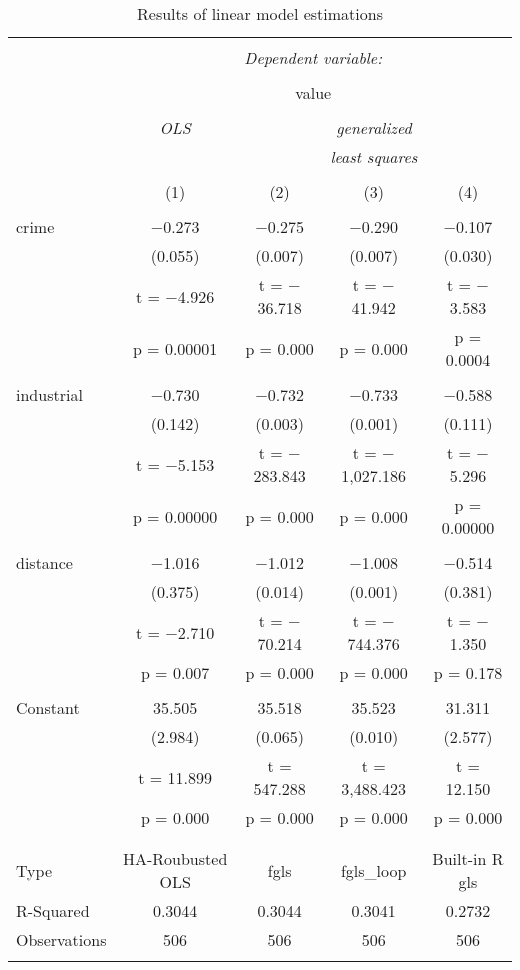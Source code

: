 \documentclass{article}
\theoremstyle{definition}
\begin{document}
\newpage
\begin{table}[htb] \centering 
	\caption{Results of linear model estimations} 
	\label{LS} 
	\small 
	\begin{tabular}{@{\extracolsep{5pt}}lcccc} 
		\\[-1.8ex]\hline 
		\hline \\[-1.8ex] 
		& \multicolumn{4}{c}{\textit{Dependent variable:}} \\ 
		\cline{2-5} 
		\\[-1.8ex] & \multicolumn{4}{c}{value} \\ 
		\\[-1.8ex] & \textit{OLS} & \multicolumn{3}{c}{\textit{generalized}} \\ 
		& \textit{} & \multicolumn{3}{c}{\textit{least squares}} \\ 
		\\[-1.8ex] & (1) & (2) & (3) & (4)\\ 
		\hline \\[-1.8ex] 
		crime & $-$0.273 & $-$0.275 & $-$0.290 & $-$0.107 \\ 
		& (0.055) & (0.007) & (0.007) & (0.030) \\ 
		& t = $-$4.926 & t = $-$36.718 & t = $-$41.942 & t = $-$3.583 \\ 
		& p = 0.00001 & p = 0.000 & p = 0.000 & p = 0.0004 \\ 
		& & & & \\ 
		industrial & $-$0.730 & $-$0.732 & $-$0.733 & $-$0.588 \\ 
		& (0.142) & (0.003) & (0.001) & (0.111) \\ 
		& t = $-$5.153 & t = $-$283.843 & t = $-$1,027.186 & t = $-$5.296 \\ 
		& p = 0.00000 & p = 0.000 & p = 0.000 & p = 0.00000 \\ 
		& & & & \\ 
		distance & $-$1.016 & $-$1.012 & $-$1.008 & $-$0.514 \\ 
		& (0.375) & (0.014) & (0.001) & (0.381) \\ 
		& t = $-$2.710 & t = $-$70.214 & t = $-$744.376 & t = $-$1.350 \\ 
		& p = 0.007 & p = 0.000 & p = 0.000 & p = 0.178 \\ 
		& & & & \\ 
		Constant & 35.505 & 35.518 & 35.523 & 31.311 \\ 
		& (2.984) & (0.065) & (0.010) & (2.577) \\ 
		& t = 11.899 & t = 547.288 & t = 3,488.423 & t = 12.150 \\ 
		& p = 0.000 & p = 0.000 & p = 0.000 & p = 0.000 \\ 
		& & & & \\ 
		\hline \\[-1.8ex] 
		Type & HA-Roubusted OLS & fgls & fgls\_loop & Built-in R gls \\ 
		R-Squared & 0.3044 & 0.3044 & 0.3041 & 0.2732 \\ 
		Observations & 506 & 506 & 506 & 506 \\ 
		\hline 
		\hline \\[-1.8ex] 
	\end{tabular} 
\end{table}  
\end{document}
